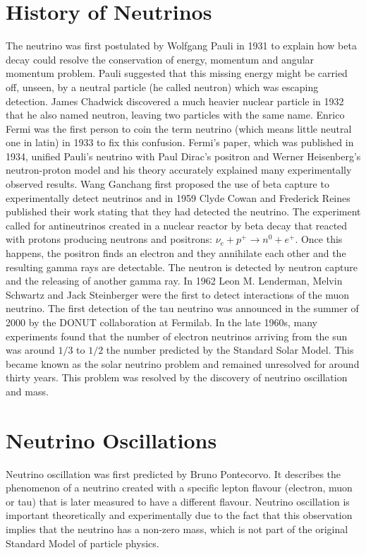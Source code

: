 \section{History of Neutrinos}
The neutrino was first postulated by Wolfgang Pauli in 1931 to explain how beta decay could resolve the conservation of energy, momentum and angular momentum problem. Pauli suggested that this missing energy might be carried off, unseen, by a neutral particle (he called neutron) which was escaping detection. James Chadwick discovered a much heavier nuclear particle in 1932 that he also named neutron, leaving two particles with the same name. Enrico Fermi was the first person to coin the term neutrino (which means little neutral one in latin) in 1933 to fix this confusion. Fermi's paper, which was published in 1934, unified Pauli's neutrino with Paul Dirac's positron and Werner Heisenberg's neutron-proton model and his theory accurately explained many experimentally observed results. Wang Ganchang first proposed the use of beta capture to experimentally detect neutrinos and in 1959 Clyde Cowan and Frederick Reines published their work stating that they had detected the neutrino. The experiment called for antineutrinos created in a nuclear reactor by beta decay that reacted with protons producing neutrons and positrons: $\nu_{e} +p^{+}\rightarrow n^{0} + e^{+}$. Once this happens, the positron finds an electron and they annihilate each other and the resulting gamma rays are detectable. The neutron is detected by neutron capture and the releasing of another gamma ray. In 1962 Leon M. Lenderman, Melvin Schwartz and Jack Steinberger were the first to detect interactions of the muon neutrino. The first detection of the tau neutrino was announced in the summer of 2000 by the DONUT collaboration at Fermilab. In the late 1960s, many experiments found that the number of electron neutrinos arriving from the sun was around $1/3$ to $1/2$ the number predicted by the Standard Solar Model. This became known as the solar neutrino problem and remained unresolved for around thirty years. This problem was resolved by the discovery of neutrino oscillation and mass.\cite{neutrino}


\section{Neutrino Oscillations}
Neutrino oscillation was first predicted by Bruno Pontecorvo. It describes the phenomenon of a neutrino created with a specific lepton flavour (electron, muon or tau) that is later measured to have a different flavour. Neutrino oscillation is important theoretically and experimentally due to the fact that this observation implies that the neutrino has a non-zero mass, which is not part of the original Standard Model of particle physics. \cite{neutrinooscillation} 


